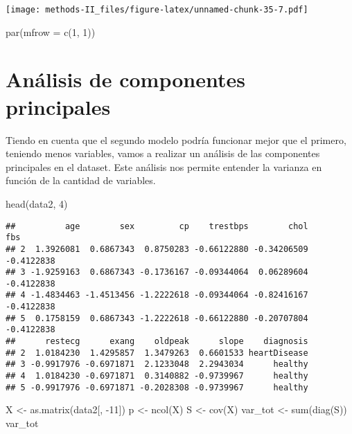 \documentclass[
]{article}
\newenvironment{Shaded}{\begin{snugshade}}{\end{snugshade}}
\newcommand{\AttributeTok}[1]{\textcolor[rgb]{0.77,0.63,0.00}{#1}}
\newcommand{\DecValTok}[1]{\textcolor[rgb]{0.00,0.00,0.81}{#1}}
\newcommand{\FunctionTok}[1]{\textcolor[rgb]{0.00,0.00,0.00}{#1}}
\newcommand{\NormalTok}[1]{#1}
\newcommand{\OtherTok}[1]{\textcolor[rgb]{0.56,0.35,0.01}{#1}}
\newcommand{\SpecialCharTok}[1]{\textcolor[rgb]{0.00,0.00,0.00}{#1}}
\begin{document}
\texttt{[image: methods-II\_files/figure-latex/unnamed-chunk-35-7.pdf]}

\begin{Shaded}
\begin{Highlighting}[]
\FunctionTok{par}\NormalTok{(}\AttributeTok{mfrow =} \FunctionTok{c}\NormalTok{(}\DecValTok{1}\NormalTok{, }\DecValTok{1}\NormalTok{))}
\end{Highlighting}
\end{Shaded}

\hypertarget{anuxe1lisis-de-componentes-principales}{%
\section{Análisis de componentes
principales}\label{anuxe1lisis-de-componentes-principales}}

Tiendo en cuenta que el segundo modelo podría funcionar mejor que el
primero, teniendo menos variables, vamos a realizar un análisis de las
componentes principales en el dataset. Este análisis nos permite
entender la varianza en función de la cantidad de variables.

\begin{Shaded}
\begin{Highlighting}[]
\FunctionTok{head}\NormalTok{(data2, }\DecValTok{4}\NormalTok{)}
\end{Highlighting}
\end{Shaded}

\begin{verbatim}
##          age        sex         cp    trestbps        chol        fbs
## 2  1.3926081  0.6867343  0.8750283 -0.66122880 -0.34206509 -0.4122838
## 3 -1.9259163  0.6867343 -0.1736167 -0.09344064  0.06289604 -0.4122838
## 4 -1.4834463 -1.4513456 -1.2222618 -0.09344064 -0.82416167 -0.4122838
## 5  0.1758159  0.6867343 -1.2222618 -0.66122880 -0.20707804 -0.4122838
##      restecg      exang    oldpeak      slope    diagnosis
## 2  1.0184230  1.4295857  1.3479263  0.6601533 heartDisease
## 3 -0.9917976 -0.6971871  2.1233048  2.2943034      healthy
## 4  1.0184230 -0.6971871  0.3140882 -0.9739967      healthy
## 5 -0.9917976 -0.6971871 -0.2028308 -0.9739967      healthy
\end{verbatim}

\begin{Shaded}
\begin{Highlighting}[]
\NormalTok{X }\OtherTok{\textless{}{-}} \FunctionTok{as.matrix}\NormalTok{(data2[, }\SpecialCharTok{{-}}\DecValTok{11}\NormalTok{])}
\NormalTok{p }\OtherTok{\textless{}{-}} \FunctionTok{ncol}\NormalTok{(X)}
\NormalTok{S }\OtherTok{\textless{}{-}} \FunctionTok{cov}\NormalTok{(X)}
\NormalTok{var\_tot }\OtherTok{\textless{}{-}} \FunctionTok{sum}\NormalTok{(}\FunctionTok{diag}\NormalTok{(S))}
\NormalTok{var\_tot}
\end{Highlighting}
\end{Shaded}
\end{document}

